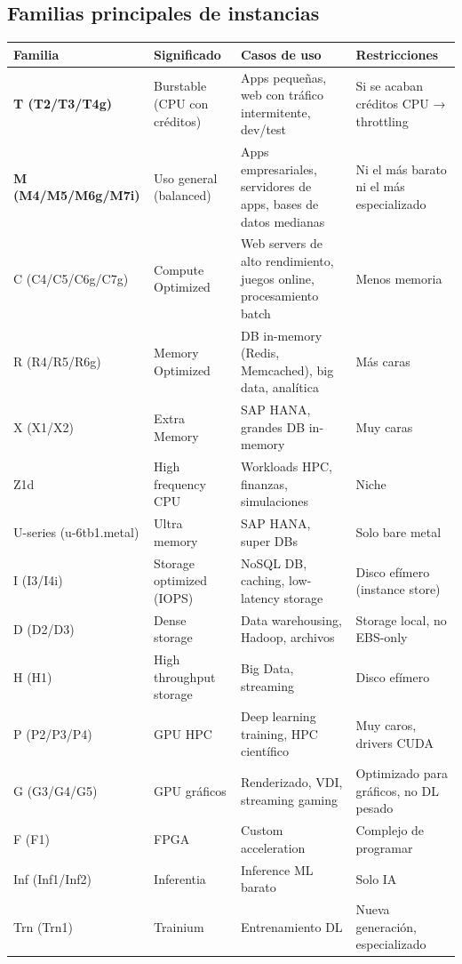 \documentclass[12pt,a4paper]{report}
\begin{document}
\subsection{Familias principales de instancias}

\begin{center}
\begin{longtable}{|p{2cm}|p{3cm}|p{4.5cm}|p{4cm}|}
\hline
\cellcolor{awsblue!20}\textbf{Familia} & \cellcolor{awsblue!20}\textbf{Significado} & \cellcolor{awsblue!20}\textbf{Casos de uso} & \cellcolor{awsblue!20}\textbf{Restricciones} \\
\hline
\cellcolor{successgreen!20}\textbf{T (T2/T3/T4g)} & Burstable (CPU con créditos) & Apps pequeñas, web con tráfico intermitente, dev/test & Si se acaban créditos CPU → throttling \\
\hline
\cellcolor{successgreen!20}\textbf{M (M4/M5/M6g/M7i)} & Uso general (balanced) & Apps empresariales, servidores de apps, bases de datos medianas & Ni el más barato ni el más especializado \\
\hline
C (C4/C5/C6g/C7g) & Compute Optimized & Web servers de alto rendimiento, juegos online, procesamiento batch & Menos memoria \\
\hline
R (R4/R5/R6g) & Memory Optimized & DB in-memory (Redis, Memcached), big data, analítica & Más caras \\
\hline
X (X1/X2) & Extra Memory & SAP HANA, grandes DB in-memory & Muy caras \\
\hline
Z1d & High frequency CPU & Workloads HPC, finanzas, simulaciones & Niche \\
\hline
U-series (u-6tb1.metal) & Ultra memory & SAP HANA, super DBs & Solo bare metal \\
\hline
I (I3/I4i) & Storage optimized (IOPS) & NoSQL DB, caching, low-latency storage & Disco efímero (instance store) \\
\hline
D (D2/D3) & Dense storage & Data warehousing, Hadoop, archivos & Storage local, no EBS-only \\
\hline
H (H1) & High throughput storage & Big Data, streaming & Disco efímero \\
\hline
P (P2/P3/P4) & GPU HPC & Deep learning training, HPC científico & Muy caros, drivers CUDA \\
\hline
G (G3/G4/G5) & GPU gráficos & Renderizado, VDI, streaming gaming & Optimizado para gráficos, no DL pesado \\
\hline
F (F1) & FPGA & Custom acceleration & Complejo de programar \\
\hline
Inf (Inf1/Inf2) & Inferentia & Inference ML barato & Solo IA \\
\hline
Trn (Trn1) & Trainium & Entrenamiento DL & Nueva generación, especializado \\
\hline
\end{longtable}
\end{center}
\end{document}
